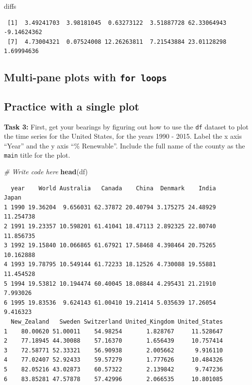 \documentclass[
]{book}
\newenvironment{Shaded}{\begin{snugshade}}{\end{snugshade}}
\newcommand{\CommentTok}[1]{\textcolor[rgb]{0.56,0.35,0.01}{\textit{#1}}}
\newcommand{\KeywordTok}[1]{\textcolor[rgb]{0.13,0.29,0.53}{\textbf{#1}}}
\newcommand{\NormalTok}[1]{#1}
\begin{document}
\begin{Shaded}
\begin{Highlighting}[]
\NormalTok{diffs}
\end{Highlighting}
\end{Shaded}

\begin{verbatim}
 [1]  3.49241703  3.98181045  0.63273122  3.51887728 62.33064943 -9.14624362
 [7]  4.73004321  0.07524008 12.26263811  7.21543884 23.01128298  1.69994636
\end{verbatim}

\hypertarget{multi-pane-plots-with-for-loops}{%
\subsection*{\texorpdfstring{Multi-pane plots with \texttt{for\ loops}}{Multi-pane plots with for loops}}\label{multi-pane-plots-with-for-loops}}

\hypertarget{practice-with-a-single-plot}{%
\subsection*{Practice with a single plot}\label{practice-with-a-single-plot}}

\textbf{Task 3:} First, get your bearings by figuring out how to use the \texttt{df} dataset to plot the time series for the United States, for the years 1990 - 2015. Label the x axis ``Year'' and the y axis ``\% Renewable''. Include the full name of the county as the \texttt{main} title for the plot.

\begin{Shaded}
\begin{Highlighting}[]
\CommentTok{# Write code here}
\KeywordTok{head}\NormalTok{(df)}
\end{Highlighting}
\end{Shaded}

\begin{verbatim}
  year    World Australia   Canada    China  Denmark    India     Japan
1 1990 19.36204  9.656031 62.37872 20.40794 3.175275 24.48929 11.254738
2 1991 19.23357 10.598201 61.41041 18.47113 2.892325 22.80740 11.856735
3 1992 19.15840 10.066865 61.67921 17.58468 4.398464 20.75265 10.162888
4 1993 19.78795 10.549144 61.72233 18.12526 4.730088 19.55881 11.454528
5 1994 19.53812 10.194474 60.40045 18.08844 4.295431 21.21910  7.993026
6 1995 19.83536  9.624143 61.00410 19.21414 5.035639 17.26054  9.416323
  New_Zealand   Sweden Switzerland United_Kingdom United_States
1    80.00620 51.00011    54.98254       1.828767     11.528647
2    77.18945 44.30088    57.16370       1.656439     10.757414
3    72.58771 52.33321    56.90938       2.005662      9.916110
4    77.02407 52.92433    59.57279       1.777626     10.484326
5    82.05216 43.02873    60.57322       2.139842      9.747236
6    83.85281 47.57878    57.42996       2.066535     10.801085
\end{verbatim}
\end{document}
